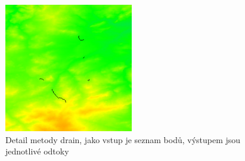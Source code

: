 \documentclass[12pt,a4paper,titlepage,final]{report}
\begin{document}
\begin{figure}[ht]
\begin{center}
\includegraphics[width=0.5\textwidth]{images/drain_detail.jpg}
\caption{Detail metody drain, jako vstup je seznam bodů, výstupem jsou jednotlivé odtoky}
\label{fig:slope-cr}
\end{center}
\end{figure}




\nocite{grass}
\nocite{arcgis}
\nocite{grass-src}
\nocite{freegis}
\nocite{gis-modelling}

\hypertarget{bib}{}

\end{document}

